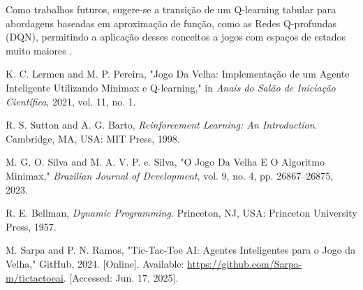 \documentclass[conference]{IEEEtran}
\begin{document}
Como trabalhos futuros, sugere-se a transição de um Q-learning tabular para abordagens baseadas em aproximação de função, como as Redes Q-profundas (DQN), permitindo a aplicação desses conceitos a jogos com espaços de estados muito maiores \cite{lermen2021, sutton1998}.

\begin{thebibliography}{00}

K. C. Lermen and M. P. Pereira, "Jogo Da Velha: Implementação de um Agente Inteligente Utilizando Minimax e Q-learning," in \textit{Anais do Salão de Iniciação Científica}, 2021, vol. 11, no. 1.

R. S. Sutton and A. G. Barto, \textit{Reinforcement Learning: An Introduction}. Cambridge, MA, USA: MIT Press, 1998.

M. G. O. Silva and M. A. V. P. e. Silva, "O Jogo Da Velha E O Algoritmo Minimax," \textit{Brazilian Journal of Development}, vol. 9, no. 4, pp. 26867–26875, 2023.

R. E. Bellman, \textit{Dynamic Programming}. Princeton, NJ, USA: Princeton University Press, 1957.

M. Sarpa and P. N. Ramos, "Tic-Tac-Toe AI: Agentes Inteligentes para o Jogo da Velha," GitHub, 2024. [Online]. Available: \url{https://github.com/Sarpa-m/tictactoeai}. [Accessed: Jun. 17, 2025].

\end{thebibliography}

\end{document}
